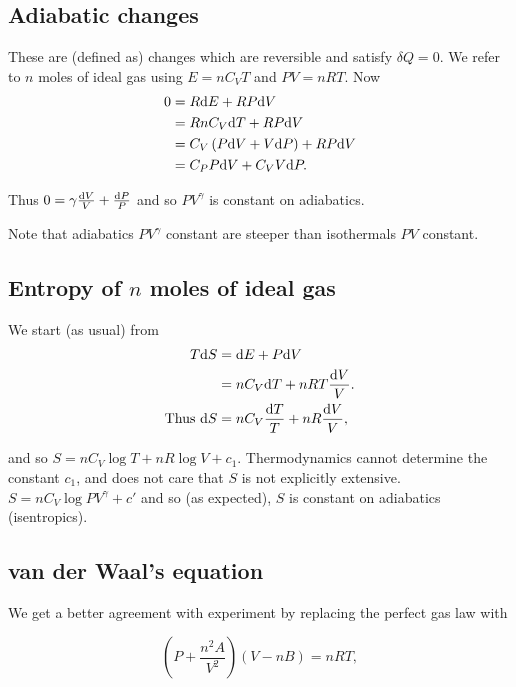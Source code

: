 \documentclass{notes}
\begin{document}
\subsection{Adiabatic changes}

These are (defined as) changes which are reversible and satisfy
$\delta Q = 0$.  We refer to $n$ moles of ideal gas using $E = n C_V T$
and $PV = n R T$.  Now
\begin{align*}
0 &= R \mathrm{d} E + R P \mathrm{d} V \\
&= R n C_V \mathrm{d} T + R P \mathrm{d} V \\
&= C_V \left( P \mathrm{d} V + V \mathrm{d} P \right) + R P \mathrm{d} V \\
&= C_P P \mathrm{d} V + C_V V \mathrm{d} P.
\end{align*}

Thus $0 = \gamma \frac{\mathrm{d} V}{V} + \frac{\mathrm{d} P}{P}$ and so
$P V^\gamma$ is constant on adiabatics.

Note that adiabatics $P V^\gamma$ constant are steeper than isothermals $PV$
constant.

\subsection{Entropy of $n$ moles of ideal gas}

We start (as usual) from
\begin{align*}
T \mathrm{d} S &= \mathrm{d} E + P \mathrm{d} V \\
&= n C_V \mathrm{d} T + n R T \frac{\mathrm{d} V}{V}. \\
\text{Thus } \mathrm{d} S &= n C_V \frac{\mathrm{d} T}{T} + n R \frac{\mathrm{d} V}{V},
\end{align*}

and so $S = n C_V \log T + n R \log V + c_1$.  Thermodynamics cannot
determine the constant $c_1$, and does not care that $S$ is not
explicitly extensive. $S = n C_V \log P V^\gamma + c'$ and so
(as expected), $S$ is constant on adiabatics (isentropics).

\subsection{van der Waal's equation}

We get a better agreement with experiment by replacing the perfect gas
law with

\begin{equation}\label{eq:vdW}
\left( P + \frac{n^2 A}{V^2} \right) \left(V - n B\right) = n R T,
\end{equation}
\end{document}
